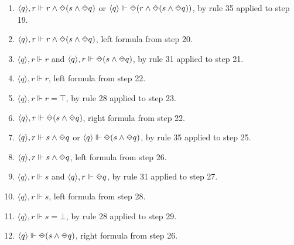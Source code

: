 \begin{myEx}
\begin{enumerate}
\item $\langle q \rangle, r \Vdash r \land \LTLonce(s \land \LTLonce q)$ or $\langle q \rangle \Vdash \LTLonce(r \land \LTLonce(s \land \LTLonce q))$, by rule 35 applied to step 19.\\ %

\item $\langle q \rangle, r \Vdash r \land \LTLonce(s \land \LTLonce q)$, left formula from step 20.\\ %

\item $\langle q \rangle, r \Vdash r$ and $\langle q \rangle, r \Vdash \LTLonce(s \land \LTLonce q)$, by rule 31 applied to step 21.\\ %

\item $\langle q \rangle, r \Vdash r$, left formula from step 22.\\ %

\item $\langle q \rangle, r \Vdash r = \top$, by rule 28 applied to step 23.\\ %

\item $\langle q \rangle, r \Vdash \LTLonce(s \land \LTLonce q)$, right formula from step 22.\\ %

\item $\langle q \rangle, r \Vdash s \land \LTLonce q$ or $\langle q \rangle \Vdash \LTLonce(s \land \LTLonce q)$, by rule 35 applied to step 25.\\ %

\item $\langle q \rangle, r \Vdash s \land \LTLonce q$, left formula from step 26.\\ %

\item $\langle q \rangle, r \Vdash s$ and $\langle q \rangle, r \Vdash \LTLonce q$, by rule 31 applied to step 27.\\ %

\item $\langle q \rangle, r \Vdash s$, left formula from step 28.\\ %

\item $\langle q \rangle, r \Vdash s = \bot$, by rule 28 applied to step 29.\\ %

\item $\langle q \rangle \Vdash \LTLonce(s \land \LTLonce q)$, right formula from step 26.\\ %


\end{enumerate}
\end{myEx}
